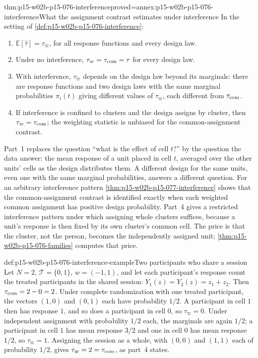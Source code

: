 \begin{hbtheorem}{thm:p15-w02b-p15-076-interference}{proved=annex:p15-w02b-p15-076-interference}{What the assignment contrast estimates under interference}
In the setting of \cref{def:p15-w02b-p15-076-interference}:
\begin{enumerate}
\item \(\mathbb E[\widehat\tau]=\tau_\varpi\), for all response
      functions and every design law.
\item Under no interference, \(\tau_\varpi=\tau_{\rm com}=\tau\) for every
      design law.
\item With interference, \(\tau_\varpi\) depends on the design law beyond
      its marginals: there are response functions and two design laws
      with the same marginal probabilities \(\pi_i(t)\) giving different
      values of \(\tau_\varpi\), each different from \(\tau_{\rm com}\).
\item If interference is confined to clusters and the design assigns by
      cluster, then \(\tau_\varpi=\tau_{\rm com}\); the weighting statistic
      is unbiased for the common-assignment contrast.
\end{enumerate}
\end{hbtheorem}

Part~1 replaces the question ``what is the effect of cell \(t\)?'' by the
question the data answer: the mean response of a unit placed in cell \(t\),
averaged over the other units' cells as the design distributes them. A
different design for the same units, even one with the same marginal
probabilities, answers a different question. For an arbitrary interference
pattern \cref{thm:p15-w02b-p15-077-interference} shows that the
common-assignment contrast is identified exactly when each weighted common
assignment has positive design probability. Part~4 gives a restricted
interference pattern under which assigning whole clusters suffices, because
a unit's response is then fixed by its own cluster's common cell. The
price is that the cluster, not the person, becomes the independently
assigned unit; \cref{thm:p15-w02b-p15-076-families} computes that price.

\begin{hbexample}{def:p15-w02b-p15-076-interference-example}{Two participants who share a session}
Let \(N=2\), \(\mathcal T=\{0,1\}\), \(w=(-1,1)\), and let each
participant's response count the treated participants in the shared
session: \(Y_1(z)=Y_2(z)=z_1+z_2\). Then \(\tau_{\rm com}=2-0=2\).
Under complete randomization with one treated participant, the vectors
\((1,0)\) and \((0,1)\) each have probability \(1/2\). A participant in
cell \(1\) then has response \(1\), and so does a participant in cell
\(0\), so \(\tau_\varpi=0\). Under independent assignment with
probability \(1/2\) each, the marginals are again \(1/2\); a participant in
cell \(1\) has mean response \(3/2\) and one in cell \(0\) has mean
response \(1/2\), so \(\tau_\varpi=1\). Assigning the session as a whole,
with \((0,0)\) and \((1,1)\) each of probability \(1/2\), gives
\(\tau_\varpi=2=\tau_{\rm com}\), as part~4 states.
\end{hbexample}


